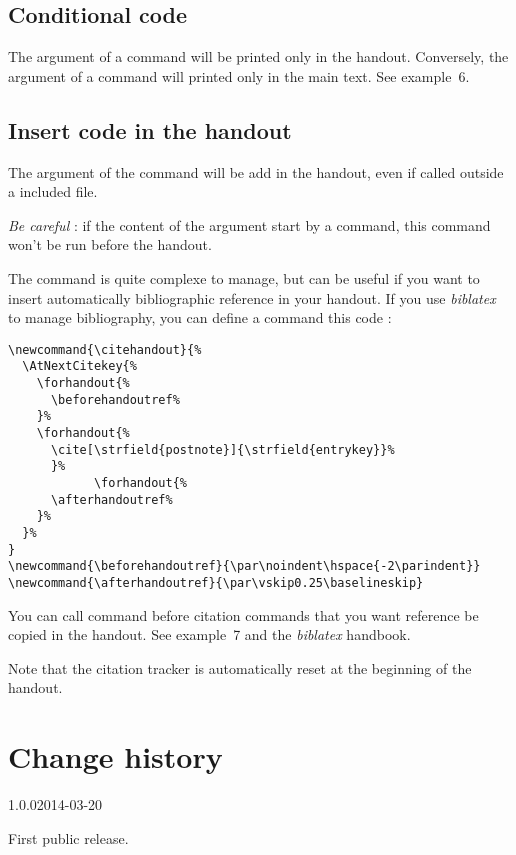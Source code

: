 \documentclass{ltxdockit}[2011/03/25]
\begin{document}
\subsection{Conditional code}

The argument of a   command will be printed only in the handout. Conversely, the argument of a command  will printed only in the main text. See example~6.

\subsection{Insert code in the handout}

The argument of the   command will be add in the handout, even if called outside a included file. 

\emph{Be careful} : if the content of the argument start by a command, this command won't be run before the handout. 

The  command is quite complexe to manage, but can be useful if you want to insert automatically bibliographic reference in your handout. If you use \emph{biblatex} to manage bibliography, you can define a  command  this code  :

\begin{verbatim}
\newcommand{\citehandout}{%
  \AtNextCitekey{%
    \forhandout{%
      \beforehandoutref%
    }%
    \forhandout{%
      \cite[\strfield{postnote}]{\strfield{entrykey}}%
      }%
            \forhandout{%
      \afterhandoutref%
    }%
  }%
}
\newcommand{\beforehandoutref}{\par\noindent\hspace{-2\parindent}}
\newcommand{\afterhandoutref}{\par\vskip0.25\baselineskip}
\end{verbatim}

You can call  command before citation commands that you want reference be copied in the handout. See example~7 and the \emph{biblatex} handbook.

Note that the citation tracker is automatically reset at the beginning of the handout.

\section{Change history}

\begin{changelog}

\begin{release}{1.0.0}{2014-03-20}
\item First public release.
\end{release}
\end{changelog}
\end{document}
